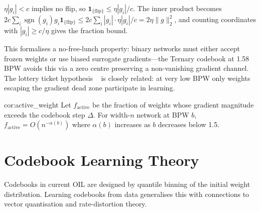\begin{proofsketch}
$\eta|g_i| < c$ implies no flip, so $\mathbf{1}_{\{\text{flip}\}} \leq
\eta|g_i|/c$. The inner product becomes $2c\sum_i \operatorname{sgn}(g_i)g_i
\mathbf{1}_{\{\text{flip}\}} \leq 2c\sum_i |g_i| \cdot \eta|g_i|/c =
2\eta\|g\|_2^2$, and counting coordinates with $|g_i| \geq c/\eta$ gives
the fraction bound.
\end{proofsketch}
This formalises a no-free-lunch property: binary networks must either
accept frozen weights or use biased surrogate gradients---the Ternary
codebook at 1.58\,BPW avoids this via a zero centre preserving a
non-vanishing gradient channel. The lottery ticket hypothesis
~\cite{frankle2019} is closely related: at very low BPW only weights
escaping the gradient dead zone participate in learning.
\begin{mycor}{cor:active_weight}
Let $f_{\text{active}}$ be the fraction of weights whose gradient magnitude
exceeds the codebook step $\Delta$. For width-$n$ network at BPW $b$,
$f_{\text{active}} = O(n^{-\alpha(b)})$ where $\alpha(b)$ increases as
$b$ decreases below 1.5.
\end{mycor}

\section{Codebook Learning Theory}
\label{sec:codebook_learning}
Codebooks in current OIL are designed by quantile binning of the initial
weight distribution. Learning codebooks from data generalises this with
connections to vector quantisation and rate-distortion theory.
